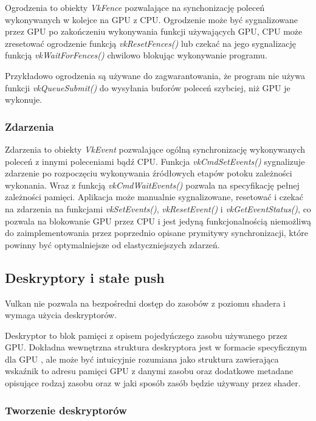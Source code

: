 Ogrodzenia to obiekty \textit{VkFence} pozwalające na synchonizację poleceń wykonywanych w kolejce na GPU z CPU.
Ogrodzenie może być sygnalizowane przez GPU po zakończeniu wykonywania funkcji używających GPU, CPU może zresetować ogrodzenie
funkcją \textit{vkResetFences()} lub czekać na jego sygnalizację funkcją \textit{vkWaitForFences()} chwilowo blokując wykonywanie programu.

Przykładowo ogrodzenia są używane do zagwarantowania, że program nie używa funkcji \textit{vkQueueSubmit()} do wysyłania buforów poleceń szybciej, niż GPU je wykonuje.

\subsubsection{Zdarzenia}
Zdarzenia to obiekty \textit{VkEvent} pozwalające ogólną synchronizację wykonywanych poleceń z innymi poleceniami bądź CPU.
Funkcja \textit{vkCmdSetEvents()} sygnalizuje zdarzenie po rozpoczęciu wykonywania źródłowych etapów potoku zależności wykonania. Wraz z funkcją \textit{vkCmdWaitEvents()} pozwala na specyfikację pełnej zależności pamięci.
Aplikacja może manualnie sygnalizowane, resetować i czekać na zdarzenia na funkcjami \textit{vkSetEvents()}, \textit{vkResetEvent()} i \textit{vkGetEventStatus()}, co pozwala na blokowanie GPU przez CPU i jest jedyną funkcjonalnością niemożliwą do zaimplementowania przez poprzednio opisane prymitywy synchronizacji, które powinny być optymalniejsze od elastyczniejszych zdarzeń.

\subsection{Deskryptory i stałe push}

Vulkan nie pozwala na bezpośredni dostęp do zasobów z poziomu shadera i wymaga użycia deskryptorów.

Deskryptor to blok pamięci z opisem pojedyńczego zasobu używanego przez GPU. Dokładna wewnętrzna struktura deskryptora jest w formacie specyficznym dla GPU \cite{DESCRIPTORSHARD}, ale może być intuicyjnie rozumiana jako struktura zawierająca wskaźnik to adresu pamięci GPU z danymi zasobu oraz dodatkowe metadane opisujące rodzaj zasobu oraz w jaki sposób zasób będzie używany przez shader.

\subsubsection{Tworzenie deskryptorów}

